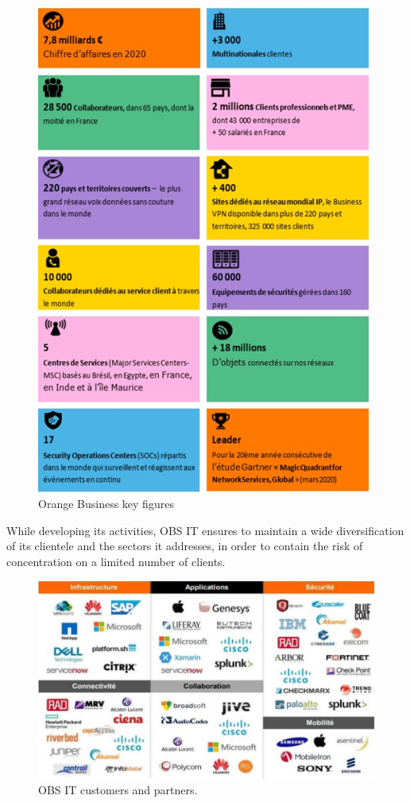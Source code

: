 \begin{figure}[hbt!]
  \centering
  \includegraphics[width=11cm]{Figures/chiffre.png}
  \caption{Orange Business key figures}
  \label{fig:vue-snoc-pos}
\end{figure}

\newpage

While developing its activities, OBS IT ensures to maintain a wide diversification of its clientele and the sectors it addresses, in order to contain the risk of concentration on a limited number of clients.

\begin{figure}[hbt!]
  \centering
  \includegraphics[width=15cm]{Figures/partenaire.png}
  \caption{OBS IT customers and partners.}
  \label{fig:vue-snoc-pos}
\end{figure}

